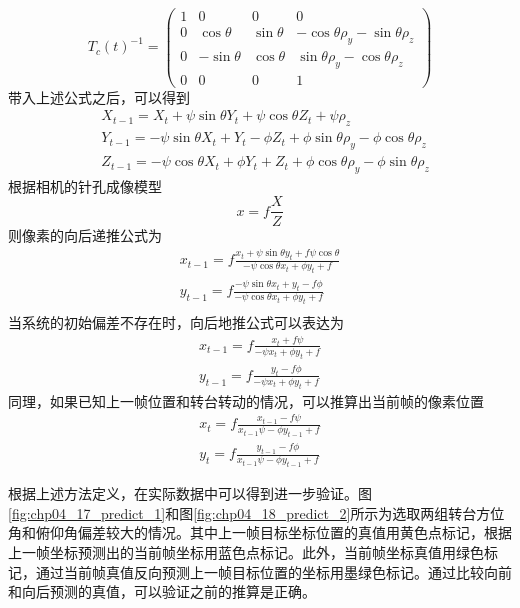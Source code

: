 \begin{equation}
T_c(t)^{-1} =\begin{pmatrix} 1 & 0 & 0 & 0 \\ 0 & \cos \theta & \sin \theta & -\cos \theta \rho_y -\sin \theta \rho_z \\0 & -\sin \theta & \cos \theta & \sin\theta \rho_y-\cos \theta \rho_z \\ 0 & 0 & 0 & 1 \end{pmatrix}
\end{equation}
带入上述公式之后，可以得到
\begin{align}
&X_{t-1} = X_t + \psi \sin \theta Y_t + \psi \cos \theta Z_t + \psi \rho_z \\
&Y_{t-1} = -\psi \sin \theta X_t +  Y_ t - \phi Z_t + \phi \sin \theta \rho_y - \phi \cos \theta \rho_z \\
&Z_{t-1}  = -\psi \cos \theta X_t + \phi  Y_ t + Z_t + \phi \cos \theta \rho_y - \phi \sin \theta \rho_z
\end{align}
根据相机的针孔成像模型
\begin{equation}
x = f \frac{X}{Z}
\end{equation}
则像素的向后递推公式为
\begin{align}
x_{t-1} = f\frac{x_t+\psi \sin \theta y_t + f\psi \cos \theta}{- \psi \cos \theta x_t + \phi y_t + f} \\
y_{t-1} = f\frac{-\psi \sin \theta x_t +y_t -f\phi}{- \psi \cos \theta x_t + \phi y_t + f} \\
\end{align}
当系统的初始偏差不存在时，向后地推公式可以表达为
\begin{align}
\label{eq:curr_predict_prev]}
x_{t-1} = f\frac{x_t + f\psi }{- \psi  x_t  + \phi y_t + f} \\
y_{t-1} = f\frac{y_t -f\phi}{- \psi  x_t + \phi y_t + f}
\end{align}
同理，如果已知上一帧位置和转台转动的情况，可以推算出当前帧的像素位置
\begin{align}
\label{eq:prev_predict_curr}
x_{t} = f\frac{x_{t-1} - f\psi }{x_{t-1}  \psi  - \phi y_{t-1} + f} \\
y_{t} = f\frac{y_{t-1} -f\phi}{  x_{t-1} \psi - \phi y_{t-1} + f}
\end{align}

根据上述方法定义，在实际数据中可以得到进一步验证。图\ref{fig:chp04_17_predict_1}和图\ref{fig:chp04_18_predict_2}所示为选取两组转台方位角和俯仰角偏差较大的情况。其中上一帧目标坐标位置的真值用黄色点标记，根据上一帧坐标预测出的当前帧坐标用蓝色点标记。此外，当前帧坐标真值用绿色标记，通过当前帧真值反向预测上一帧目标位置的坐标用墨绿色标记。通过比较向前和向后预测的真值，可以验证之前的推算是正确。

